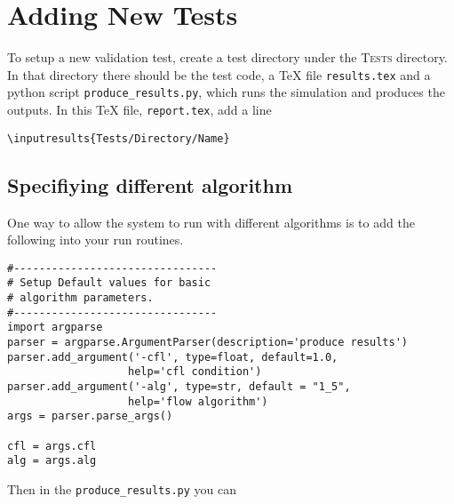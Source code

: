 \documentclass[11pt,a4paper]{report}
\begin{document}
\chapter{Adding New Tests}


To setup a new validation test, create a test directory under the
\textsc{Tests} directory. In that directory there should be the test code, a
\TeX{} file \texttt{results.tex} and a python script
\texttt{produce\_results.py}, which runs the simulation and produces the
outputs. In this \TeX{} file, \texttt{report.tex}, add a line
\begin{verbatim}
\inputresults{Tests/Directory/Name}
\end{verbatim}



\section{Specifiying different algorithm}
One  way to allow the system to run with different algorithms is to add the following
into your run routines.
\begin{verbatim}
#--------------------------------
# Setup Default values for basic
# algorithm parameters.
#--------------------------------
import argparse
parser = argparse.ArgumentParser(description='produce results')
parser.add_argument('-cfl', type=float, default=1.0,
                   help='cfl condition')
parser.add_argument('-alg', type=str, default = "1_5",
                   help='flow algorithm')
args = parser.parse_args()

cfl = args.cfl
alg = args.alg
\end{verbatim}

Then in the \texttt{produce\_results.py} you can 
\end{document}
